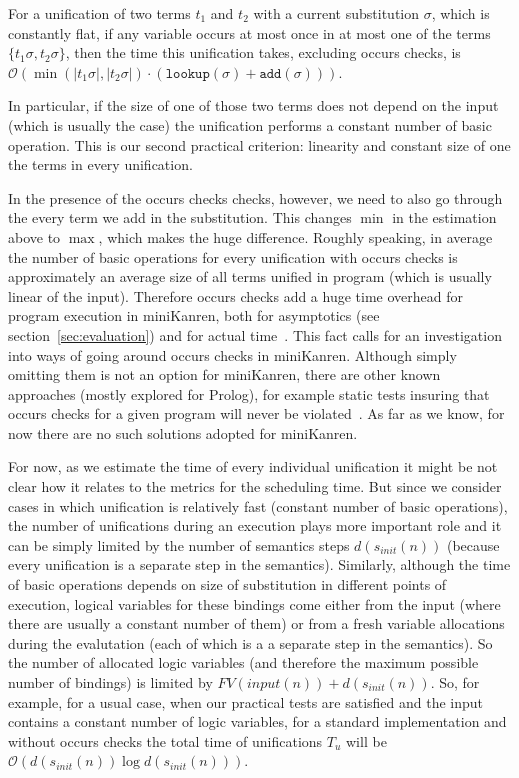 \documentclass[acmsmall, anonymous, review]{acmart}
\newcommand{\sectionword}{section}
\newcommand{\mK}{miniKanren\xspace}
\newcommand{\lookuptime}[1]{\texttt{lookup}(#1)}
\newcommand{\addtime}[1]{\texttt{add}(#1)}
\renewcommand{\O}{\mathcal{O}}
\begin{document}
\begin{lemma}
For a unification of two terms $t_1$ and $t_2$ with a current substitution $\sigma$, which is constantly flat, if any variable occurs at most once in at most one of the terms $\{ t_1 \sigma, t_2 \sigma \}$, then the time this unification takes, excluding occurs checks, is $\O(\min(|t_1 \sigma|, |t_2 \sigma|) \cdot (\lookuptime{\sigma} + \addtime{\sigma}))$.
\end{lemma}

In particular, if the size of one of those two terms does not depend on the input (which is usually the case) the unification performs a constant number of basic operation. This is our second practical criterion: linearity and constant size of one the terms in every unification.

In the presence of the occurs checks checks, however, we need to also go through the every term we add in the substitution. This changes $\min$ in the estimation above to $\max$, which makes the huge difference. Roughly speaking, in average the number of basic operations for every unification with occurs checks is approximately an average size of all terms unified in program (which is usually linear of the input). Therefore occurs checks add a huge time overhead for program execution in \mK, both for asymptotics (see \sectionword~\ref{sec:evaluation}) and for actual time~\cite{WillThesis}. This fact calls for an investigation into ways of going around occurs checks in \mK. Although simply omitting them is not an option for \mK, there are other known approaches (mostly explored for Prolog), for example static tests insuring that occurs checks for a given program will never be violated~\cite{OccursCheckStaticTest}. As far as we know, for now there are no such solutions adopted for \mK.

For now, as we estimate the time of every individual unification it might be not clear how it relates to the metrics for the scheduling time. But since we consider cases in which unification is relatively fast (constant number of basic operations), the number of unifications during an execution plays more important role and it can be simply limited by the number of semantics steps $d(s_{init}(n))$ (because every unification is a separate step in the semantics). Similarly, although the time of basic operations depends on size of substitution in different points of execution, logical variables for these bindings come either from the input (where there are usually a constant number of them) or from a fresh variable allocations during the evalutation (each of which is a a separate step in the semantics). So the number of allocated logic variables (and therefore the maximum possible number of bindings) is limited by $FV(input(n)) + d(s_{init}(n))$. So, for example, for a usual case, when our practical tests are satisfied and the input contains a constant number of logic variables, for a standard implementation and without occurs checks the total time of unifications $T_u$ will be $\O(d(s_{init}(n)) \log d(s_{init}(n)))$.
\end{document}
